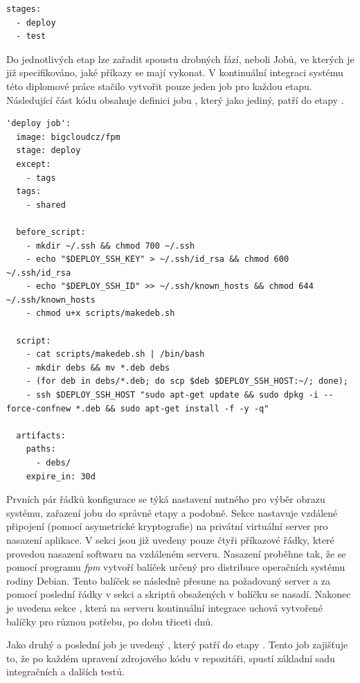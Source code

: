 \documentclass[thesis=M,czech]{FITthesis}[2012/06/26]
\begin{document}
\begin{lstlisting}[identifierstyle=\color{black}]
stages:
  - deploy
  - test
\end{lstlisting}

Do jednotlivých etap lze zařadit spoustu drobných fází, neboli Jobů, ve kterých je již specifikováno, jaké příkazy se mají vykonat. V kontinuální integraci systému této diplomové práce stačilo vytvořit pouze jeden job pro každou etapu. Následující část kódu obsahuje definici jobu , který jako jediný, patří do etapy .\\

\begin{lstlisting}[identifierstyle=\color{black}]
'deploy job':
  image: bigcloudcz/fpm
  stage: deploy
  except:
    - tags
  tags: 
    - shared

  before_script:
    - mkdir ~/.ssh && chmod 700 ~/.ssh
    - echo "$DEPLOY_SSH_KEY" > ~/.ssh/id_rsa && chmod 600 ~/.ssh/id_rsa
    - echo "$DEPLOY_SSH_ID" >> ~/.ssh/known_hosts && chmod 644 ~/.ssh/known_hosts
    - chmod u+x scripts/makedeb.sh

  script:
    - cat scripts/makedeb.sh | /bin/bash
    - mkdir debs && mv *.deb debs
    - (for deb in debs/*.deb; do scp $deb $DEPLOY_SSH_HOST:~/; done);
    - ssh $DEPLOY_SSH_HOST "sudo apt-get update && sudo dpkg -i --force-confnew *.deb && sudo apt-get install -f -y -q"

  artifacts:
    paths:
      - debs/
    expire_in: 30d
\end{lstlisting}

Prvních pár řádků konfigurace  se týká nastavení nutného pro výběr obrazu systému, zařazení jobu do správné etapy a podobně. Sekce  nastavuje vzdálené připojení (pomocí asymetrické kryptografie) na privátní virtuální server pro nasazení aplikace. V sekci  jsou již uvedeny pouze čtyři příkazové řádky, které provedou nasazení softwaru na vzdáleném serveru. Nasazení proběhne tak, že se pomocí programu \textit{fpm} vytvoří balíček určený pro distribuce operačních systému rodiny Debian. Tento balíček se následně přesune na požadovaný server a za pomocí poslední řádky v sekci  a skriptů obsažených v balíčku se nasadí. Nakonec je uvedena sekce , která na serveru kontinuální integrace uchová vytvořené balíčky pro různou potřebu, po dobu třiceti dnů.

Jako druhý a poslední job je uvedený , který patří do etapy . Tento job zajišťuje to, že po každém upravení zdrojového kódu v repozitáři, spustí základní sadu integračních a dalších testů.\\
\end{document}
